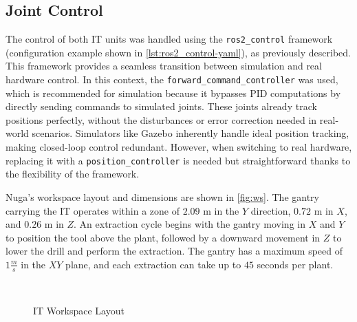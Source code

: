 \subsection{Joint Control}
The control of both \ac{IT} units was handled using the \texttt{ros2\_control} framework (configuration example shown in \autoref{lst:ros2_control-yaml}), as previously described. This framework provides a seamless transition between simulation and real hardware control. In this context, the \texttt{forward\_command\_controller} was used, which is recommended for simulation because it bypasses PID computations by directly sending commands to simulated joints. These joints already track positions perfectly, without the disturbances or error correction needed in real-world scenarios. Simulators like Gazebo inherently handle ideal position tracking, making closed-loop control redundant. However, when switching to real hardware, replacing it with a \texttt{position\_controller} is needed but straightforward thanks to the flexibility of the framework.

Nuga's workspace layout and dimensions are shown in \autoref{fig:ws}. The gantry carrying the \ac{IT} operates within a zone of $2.09$ m in the $Y$ direction, $0.72$ m in $X$, and $0.26$ m in $Z$. An extraction cycle begins with the gantry moving in $X$ and $Y$ to position the tool above the plant, followed by a downward movement in $Z$ to lower the drill and perform the extraction. The gantry has a maximum speed of $1\frac{m}{s}$ in the $XY$ plane, and each extraction can take up to $45$ seconds per plant.

\begin{figure}[t]
    \myfloatalign
     \quad
     \\
    \caption{\ac{IT} Workspace Layout}\label{fig:ws}
\end{figure}

